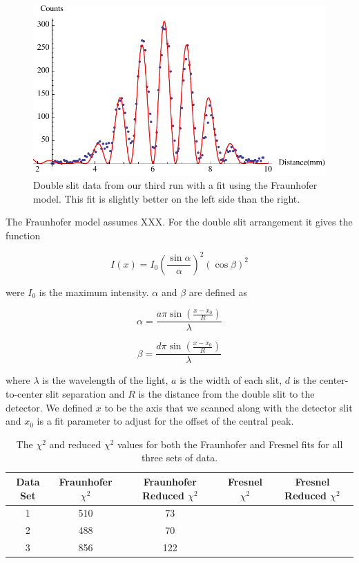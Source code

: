 \documentclass[prb,preprint]{revtex4-1}
\begin{document}
\begin{figure}[h!]
\centering
\includegraphics[width=6in]{doublefraun3.pdf}
\caption{Double slit data from our third run with a fit using the Fraunhofer model. This fit is slightly better on the left side than the right.}
\label{doublefraun3}
\end{figure}

The Fraunhofer model assumes XXX. For the double slit arrangement it gives the function

\begin{equation}
\label{fraunhofer}
I(x) = I_0 \left(\frac{\sin\alpha}{\alpha}\right)^2 \left(\cos\beta\right)^2
\end{equation}

were $I_0$ is the maximum intensity. $\alpha$ and $\beta$ are defined as

\begin{equation}
\label{alpha}
\alpha = \frac{a \pi \sin(\frac{x - x_0}{R})}{\lambda}
\end{equation}

\begin{equation}
\label{beta}
\beta = \frac{d \pi \sin(\frac{x - x_0}{R})}{\lambda}
\end{equation}

where $\lambda$ is the wavelength of the light, $a$ is the width of each slit, $d$ is the center-to-center slit separation and $R$ is the distance from the double slit to the detector. We defined $x$ to be the axis that we scanned along with the detector slit and $x_0$ is a fit parameter to adjust for the offset of the central peak.

\begin{table}[h!]
\centering
\caption{The $\chi^2$ and reduced $\chi^2$ values for both the Fraunhofer and Fresnel fits for all three sets of data.}
\begin{ruledtabular}
\begin{tabular}{c c c c c}
Data Set & Fraunhofer $\chi^2$ & Fraunhofer Reduced $\chi^2$ & Fresnel $\chi^2$ & Fresnel Reduced $\chi^2$ \\
\hline	
1 & 510 &   73 &  &   \\
2 & 488 &   70 &  &   \\
3 & 856 & 122 &  &   \\

\end{tabular}
\end{ruledtabular}
\label{chisquared}
\end{table}
\end{document}
